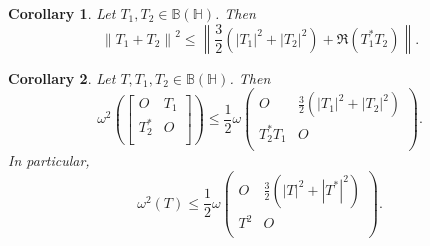 \documentclass[10pt,a4paper]{amsart}
\newtheorem{corollary}{Corollary}
\begin{document}
\begin{corollary}\label{4}
Let ${{T}_{1}},{{T}_{2}}\in \mathbb B\left( \mathbb H \right)$. Then 
	\[{{\left\| {{T}_{1}}+{{T}_{2}} \right\|}^{2}}\le \left\| \frac{3}{2}\left( {{\left| {{T}_{1}} \right|}^{2}}+{{\left| {{T}_{2}} \right|}^{2}} \right)+\Re\left( T_{1}^{*}{{T}_{2}} \right) \right\|.\]
\end{corollary}

\begin{corollary}\label{Cor_Block_two}
Let $T,{{T}_{1}},{{T}_{2}}\in \mathbb B\left( \mathbb H \right)$. Then 
	\[{{\omega }^{2}}\left( \left[ \begin{matrix}
   O & {{T}_{1}}  \\
   T_{2}^{*} & O  \\
\end{matrix} \right] \right)\le \frac{1}{2}\omega \left( \begin{matrix}
   O & \frac{3}{2}\left( {{\left| {{T}_{1}} \right|}^{2}}+{{\left| {{T}_{2}} \right|}^{2}} \right)  \\
   T_{2}^{*}{{T}_{1}} & O  \\
\end{matrix} \right).\]
In particular,
\[{{\omega }^{2}}\left( {{T}} \right)\le \frac{1}{2}\omega \left( \begin{matrix}
   O & \frac{3}{2}\left( {{\left| {{T}} \right|}^{2}}+{{\left| T^{*} \right|}^{2}} \right)  \\
   T^{2} & O  \\
\end{matrix} \right).\]
\end{corollary}
\end{document}

